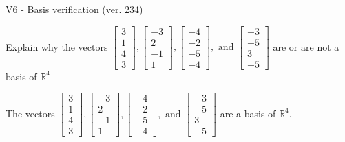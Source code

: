 \begin{exercise}
  \begin{exerciseTitle}V6 - Basis verification (ver. 234)\end{exerciseTitle}
  \begin{exerciseStatement}
    Explain why the vectors \(\left[\begin{array}{r}
3 \\
1 \\
4 \\
3
\end{array}\right] , \left[\begin{array}{r}
-3 \\
2 \\
-1 \\
1
\end{array}\right] , \left[\begin{array}{r}
-4 \\
-2 \\
-5 \\
-4
\end{array}\right] , \text{ and } \left[\begin{array}{r}
-3 \\
-5 \\
3 \\
-5
\end{array}\right]\) are or are not a basis of \(\mathbb{R}^4\)	


  \end{exerciseStatement}
  \begin{exerciseAnswer}
   The vectors \(\left[\begin{array}{r}
3 \\
1 \\
4 \\
3
\end{array}\right] , \left[\begin{array}{r}
-3 \\
2 \\
-1 \\
1
\end{array}\right] , \left[\begin{array}{r}
-4 \\
-2 \\
-5 \\
-4
\end{array}\right] , \text{ and } \left[\begin{array}{r}
-3 \\
-5 \\
3 \\
-5
\end{array}\right]\) 
  	 are  a basis of \(\mathbb{R}^4\).
  


  \end{exerciseAnswer}
\end{exercise}